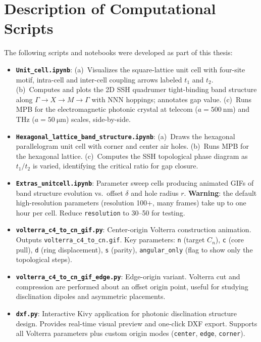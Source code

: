 \documentclass[12pt,a4paper,oneside]{book}
\theoremstyle{plain}
\theoremstyle{definition}
\theoremstyle{remark}
\begin{document}
\chapter{Description of Computational Scripts}
\label{app:scripts}

The following scripts and notebooks were developed as part of this thesis:

\begin{itemize}
  \item \textbf{\texttt{Unit\_cell.ipynb}}: (a)~Visualizes the square-lattice unit cell with four-site motif, intra-cell and inter-cell coupling arrows labeled $t_1$ and $t_2$. (b)~Computes and plots the 2D SSH quadrumer tight-binding band structure along $\Gamma \to X \to M \to \Gamma$ with NNN hoppings; annotates gap value. (c)~Runs MPB for the electromagnetic photonic crystal at telecom ($a = \SI{500}{\nano\metre}$) and THz ($a = \SI{50}{\micro\metre}$) scales, side-by-side.

  \item \textbf{\texttt{Hexagonal\_lattice\_band\_structure.ipynb}}: (a)~Draws the hexagonal parallelogram unit cell with corner and center air holes. (b)~Runs MPB for the hexagonal lattice. (c)~Computes the SSH topological phase diagram as $t_1/t_2$ is varied, identifying the critical ratio for gap closure.

  \item \textbf{\texttt{Extras\_unitcell.ipynb}}: Parameter sweep cells producing animated GIFs of band structure evolution vs.\ offset $\delta$ and hole radius $r$. \textbf{Warning}: the default high-resolution parameters (resolution 100+, many frames) take up to one hour per cell. Reduce \texttt{resolution} to 30--50 for testing.

  \item \textbf{\texttt{volterra\_c4\_to\_cn\_gif.py}}: Center-origin Volterra construction animation. Outputs \texttt{volterra\_c4\_to\_cn.gif}. Key parameters: \texttt{n} (target $C_n$), \texttt{c} (core pull), \texttt{d} (ring displacement), \texttt{s} (parity), \texttt{angular\_only} (flag to show only the topological steps).

  \item \textbf{\texttt{volterra\_c4\_to\_cn\_gif\_edge.py}}: Edge-origin variant. Volterra cut and compression are performed about an offset origin point, useful for studying disclination dipoles and asymmetric placements.

  \item \textbf{\texttt{dxf.py}}: Interactive Kivy application for photonic disclination structure design. Provides real-time visual preview and one-click DXF export. Supports all Volterra parameters plus custom origin modes (\texttt{center}, \texttt{edge}, \texttt{corner}).


\end{itemize}
\end{document}
